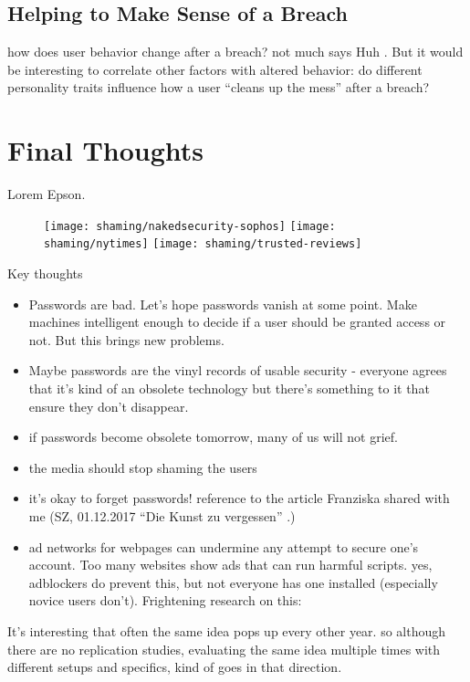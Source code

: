 \subsection{Helping to Make Sense of a Breach}
how does user behavior change after a breach? not much says Huh \etal \cite{Huh2017TooBusy}. But it would be interesting to correlate other factors with altered behavior: do different personality traits influence how a user ``cleans up the mess'' after a breach?


\section{Final Thoughts}
Lorem Epson. 

\begin{figure}[htpb]
	\centering
	\texttt{[image: shaming/nakedsecurity-sophos]}
	\texttt{[image: shaming/nytimes]}
	\texttt{[image: shaming/trusted-reviews]}
\end{figure}

Key thoughts

\begin{itemize}
\item Passwords are bad. Let's hope passwords vanish at some point. Make machines intelligent enough to decide if a user should be granted access or not. But this brings new problems.
\item Maybe passwords are the vinyl records of usable security - everyone agrees that it's kind of an obsolete technology but there's something to it that ensure they don't disappear. %
 \item  if passwords become obsolete tomorrow, many of us will not grief. 
 \item  the media should stop shaming the users 
 \item  it's okay to forget passwords! reference to the article Franziska shared with me (SZ,  01.12.2017 ``Die Kunst zu vergessen'' .)
 \item 	ad networks for webpages can undermine any attempt to secure one's account. Too many websites show ads that can run harmful scripts. yes, adblockers do prevent this, but not everyone has one installed (especially novice users don't). Frightening research on this: 
\end{itemize}

It's interesting that often the same idea pops up every other year. so although there are no replication studies, evaluating the same idea multiple times with different setups and specifics, kind of goes in that direction. 


